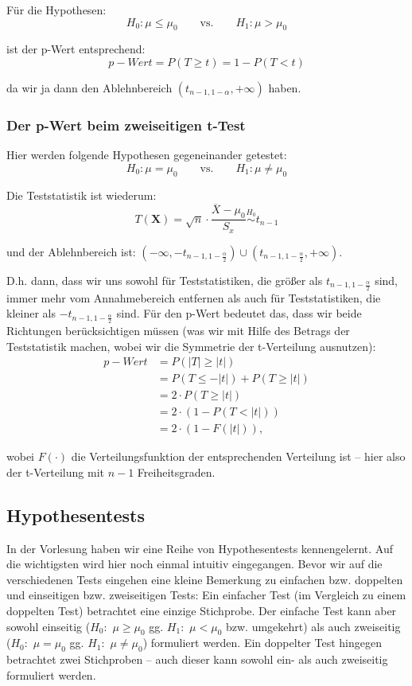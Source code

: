 \documentclass[a4paper]{article}
\newcommand{\simtext}[1]{\ensuremath{\stackrel{\text{#1}}{\sim}}}
\newcommand\dangersign{%
 \makebox[1.8em][c]{%
 \makebox[0pt][c]{\raisebox{.15em}{\small!}}%
 \makebox[0pt][c]{\color{red}\Large$\triangle$}}}%
\begin{document}
\noindent \dangersign Für die Hypothesen: 
$$H_0: \mu \leq \mu_0 \qquad \mbox{vs.} \qquad H_1: \mu > \mu_0$$

\noindent ist der p-Wert entsprechend:
$$p-Wert=P(T \geq t)=1-P(T < t)$$

\noindent da wir ja dann den Ablehnbereich $(t_{n-1,1-\alpha}, + \infty)$ haben.

\subsubsection{Der p-Wert beim zweiseitigen t-Test}\label{sec:pWert2}

Hier werden folgende Hypothesen gegeneinander getestet:
$$H_0: \mu = \mu_0 \qquad \mbox{vs.} \qquad H_1: \mu \neq \mu_0$$

\noindent Die Teststatistik ist wiederum:
$$T(\textbf{X})=\sqrt{n}\cdot\frac{\overline{X}-\mu_0}{S_x} \simtext{$H_0$} t_{n-1}$$

\noindent und der Ablehnbereich ist: $(-\infty, -t_{n-1,1-\frac{\alpha}{2}}) \cup (t_{n-1,1-\frac{\alpha}{2}}, +\infty)$.

\noindent D.h. dann, dass wir uns sowohl für Teststatistiken, die größer als $t_{n-1,1-\frac{\alpha}{2}}$ sind, immer mehr vom Annahmebereich entfernen als auch für Teststatistiken, die kleiner als $-t_{n-1,1-\frac{\alpha}{2}}$ sind. Für den p-Wert bedeutet das, dass wir beide Richtungen berücksichtigen müssen (was wir mit Hilfe des Betrags der Teststatistik machen, wobei wir die Symmetrie der t-Verteilung ausnutzen):
\begin{align*} 
p-Wert &= P(|T| \geq |t|)  \\
	&=	P(T \leq -|t|) + P(T \geq |t|)			\\
	&=	2 \cdot P(T \geq |t|)			\\
	&=	2 \cdot (1-P(T < |t|))			\\
	&=	2 \cdot (1-F(|t|)),		
\end{align*} 

\noindent wobei $F(\cdot)$ die Verteilungsfunktion der entsprechenden Verteilung ist -- hier also der t-Verteilung mit $n-1$ Freiheitsgraden.


\subsection{Hypothesentests}\label{sec:HypTests}

In der Vorlesung haben wir eine Reihe von Hypothesentests kennengelernt. Auf die wichtigsten wird hier noch einmal intuitiv eingegangen. Bevor wir auf die verschiedenen Tests eingehen eine kleine Bemerkung zu einfachen bzw. doppelten und einseitigen bzw. zweiseitigen Tests:
Ein einfacher Test (im Vergleich zu einem doppelten Test) betrachtet eine einzige Stichprobe. Der einfache Test kann aber sowohl einseitig ($H_0:$ $\mu \geq \mu_0$ gg. $H_1:$ $\mu < \mu_0$ bzw. umgekehrt) als auch zweiseitig ($H_0:$ $\mu = \mu_0$ gg. $H_1:$ $\mu \neq \mu_0$) formuliert werden. Ein doppelter Test hingegen betrachtet zwei Stichproben -- auch dieser kann sowohl ein- als auch zweiseitig formuliert werden.
\end{document}
